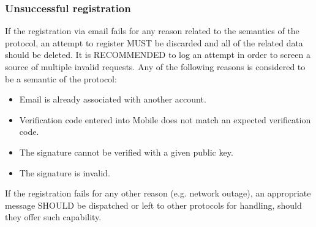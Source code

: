             \subsubsection{Unsuccessful registration}
            If the registration via email fails for any reason related to the semantics of the protocol, an attempt to
            register MUST be discarded and all of the related data should be deleted. It is RECOMMENDED to log an attempt
            in order to screen a source of multiple invalid requests. Any of the following reasons is considered to be
            a semantic of the protocol:
            \begin{itemize}
                  \item Email is already associated with another account.
                  \item Verification code entered into Mobile does not match an expected verification code.
                  \item The signature cannot be verified with a given public key.
                  \item The signature is invalid.
            \end{itemize}
            If the registration fails for any other reason (e.g. network outage), an appropriate message SHOULD be
            dispatched or left to other protocols for handling, should they offer such capability.
